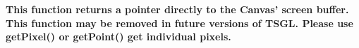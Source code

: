 
\begin{DoxyRefList}
\item[\label{deprecated__deprecated000001}%
\hypertarget{deprecated__deprecated000001}{}%
\-Member \hyperlink{classtsgl_1_1_canvas_a71f072dd82ca3b5cecfd65cde6d8a226}{tsgl\-:\-:\-Canvas\-:\-:get\-Screen\-Buffer} ()]{\bfseries \-This function returns a pointer directly to the \-Canvas' screen buffer. \-This function may be removed in future versions of \-T\-S\-G\-L. \-Please use get\-Pixel() or get\-Point() get individual pixels. }
\end{DoxyRefList}